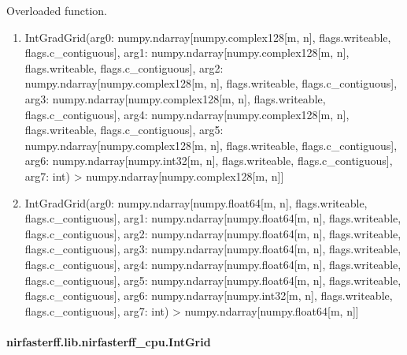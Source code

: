 \documentclass[letterpaper,10pt,english]{sphinxmanual}
\begin{document}
\begin{fulllineitems}
\label{\detokenize{_autosummary/nirfasterff.lib.nirfasterff_cpu.IntGradGrid:nirfasterff.lib.nirfasterff_cpu.IntGradGrid}}
\pysigstartsignatures
{}
\pysigstopsignatures
\sphinxAtStartPar
Overloaded function.
\begin{enumerate}
%
\item {} 
\sphinxAtStartPar
IntGradGrid(arg0: numpy.ndarray{[}numpy.complex128{[}m, n{]}, flags.writeable, flags.c\_contiguous{]}, arg1: numpy.ndarray{[}numpy.complex128{[}m, n{]}, flags.writeable, flags.c\_contiguous{]}, arg2: numpy.ndarray{[}numpy.complex128{[}m, n{]}, flags.writeable, flags.c\_contiguous{]}, arg3: numpy.ndarray{[}numpy.complex128{[}m, n{]}, flags.writeable, flags.c\_contiguous{]}, arg4: numpy.ndarray{[}numpy.complex128{[}m, n{]}, flags.writeable, flags.c\_contiguous{]}, arg5: numpy.ndarray{[}numpy.complex128{[}m, n{]}, flags.writeable, flags.c\_contiguous{]}, arg6: numpy.ndarray{[}numpy.int32{[}m, n{]}, flags.writeable, flags.c\_contiguous{]}, arg7: int) \sphinxhyphen{}\textgreater{} numpy.ndarray{[}numpy.complex128{[}m, n{]}{]}

\item {} 
\sphinxAtStartPar
IntGradGrid(arg0: numpy.ndarray{[}numpy.float64{[}m, n{]}, flags.writeable, flags.c\_contiguous{]}, arg1: numpy.ndarray{[}numpy.float64{[}m, n{]}, flags.writeable, flags.c\_contiguous{]}, arg2: numpy.ndarray{[}numpy.float64{[}m, n{]}, flags.writeable, flags.c\_contiguous{]}, arg3: numpy.ndarray{[}numpy.float64{[}m, n{]}, flags.writeable, flags.c\_contiguous{]}, arg4: numpy.ndarray{[}numpy.float64{[}m, n{]}, flags.writeable, flags.c\_contiguous{]}, arg5: numpy.ndarray{[}numpy.float64{[}m, n{]}, flags.writeable, flags.c\_contiguous{]}, arg6: numpy.ndarray{[}numpy.int32{[}m, n{]}, flags.writeable, flags.c\_contiguous{]}, arg7: int) \sphinxhyphen{}\textgreater{} numpy.ndarray{[}numpy.float64{[}m, n{]}{]}

\end{enumerate}

\end{fulllineitems}


\sphinxstepscope


\paragraph{nirfasterff.lib.nirfasterff\_cpu.IntGrid}
\label{\detokenize{_autosummary/nirfasterff.lib.nirfasterff_cpu.IntGrid:nirfasterff-lib-nirfasterff-cpu-intgrid}}\label{\detokenize{_autosummary/nirfasterff.lib.nirfasterff_cpu.IntGrid::doc}}
\end{document}
